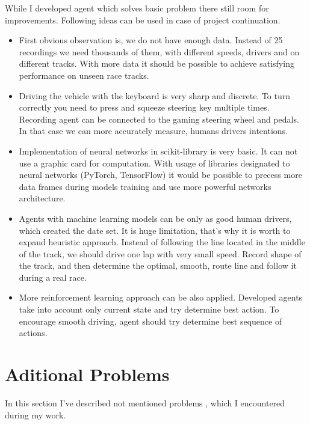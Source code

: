 \documentclass[declaration,shortabstract,english,inz]{iithesis}
\begin{document}
While I developed agent which solves basic problem there still room for improvements.
Following ideas can be used in case of project continuation.
\begin{itemize}
    \item First obvious observation is, we do not have enough data.
Instead of 25 recordings we need thousands of them, with different speeds, drivers and on different tracks.
With more data it should be possible to achieve satisfying performance on unseen race tracks.

    \item Driving the vehicle with the keyboard is very sharp and discrete.
To turn correctly you need to press and squeeze steering key multiple times.
Recording agent can be connected to the gaming steering wheel and pedals.
In that case we can more accurately measure, humans drivers intentions.

    \item Implementation of neural networks in scikit-library is very basic.
It can not use a graphic card for computation.
With usage of libraries designated to neural networks (PyTorch, TensorFlow) it would be possible to precess more data frames during models training and use more  powerful networks architecture.
    \item Agents with machine learning models  can be only as good human drivers, which created the date set.
It is huge limitation, that's why it is worth to expand heuristic approach.
Instead of following the line located in the middle of the track, we should drive one lap with very small speed.
Record shape of the track, and then determine the optimal, smooth, route line and follow it during a real race.

    \item More reinforcement learning approach can be also applied.
Developed agents take into account only current state and try determine best action.
To encourage smooth driving, agent should try determine best sequence of actions.
\end{itemize}



\section{Aditional Problems}
In this section I've described not mentioned problems , which I encountered during my work.
 
\end{document}
